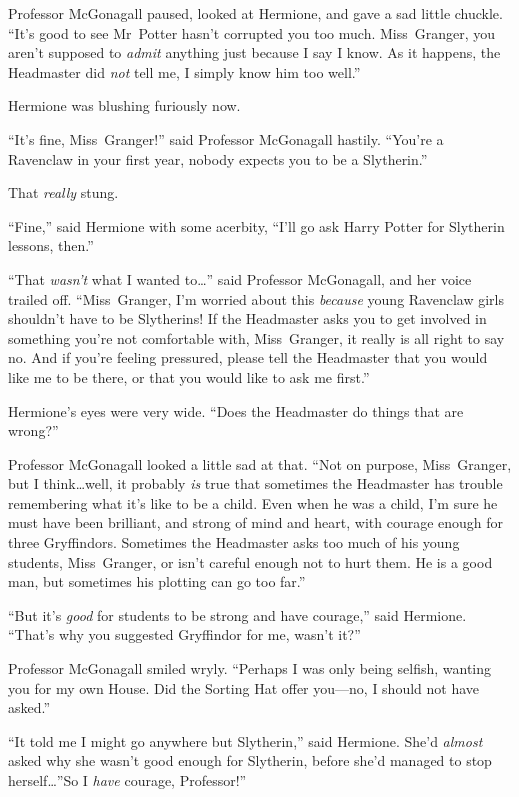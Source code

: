 Professor McGonagall paused, looked at Hermione, and gave a sad little chuckle. “It’s good to see Mr~Potter hasn’t corrupted you too much. Miss~Granger, you aren’t supposed to \emph{admit} anything just because I say I know. As it happens, the Headmaster did \emph{not} tell me, I simply know him too well.”

Hermione was blushing furiously now.

“It’s fine, Miss~Granger!” said Professor McGonagall hastily. “You’re a Ravenclaw in your first year, nobody expects you to be a Slytherin.”

That \emph{really} stung.

“Fine,” said Hermione with some acerbity, “I’ll go ask Harry Potter for Slytherin lessons, then.”

“That \emph{wasn’t} what I wanted to…” said Professor McGonagall, and her voice trailed off. “Miss~Granger, I’m worried about this \emph{because} young Ravenclaw girls shouldn’t have to be Slytherins! If the Headmaster asks you to get involved in something you’re not comfortable with, Miss~Granger, it really is all right to say no. And if you’re feeling pressured, please tell the Headmaster that you would like me to be there, or that you would like to ask me first.”

Hermione’s eyes were very wide. “Does the Headmaster do things that are wrong?”

Professor McGonagall looked a little sad at that. “Not on purpose, Miss~Granger, but I think…well, it probably \emph{is} true that sometimes the Headmaster has trouble remembering what it’s like to be a child. Even when he was a child, I’m sure he must have been brilliant, and strong of mind and heart, with courage enough for three Gryffindors. Sometimes the Headmaster asks too much of his young students, Miss~Granger, or isn’t careful enough not to hurt them. He is a good man, but sometimes his plotting can go too far.”

“But it’s \emph{good} for students to be strong and have courage,” said Hermione. “That’s why you suggested Gryffindor for me, wasn’t it?”

Professor McGonagall smiled wryly. “Perhaps I was only being selfish, wanting you for my own House. Did the Sorting Hat offer you—no, I should not have asked.”

“It told me I might go anywhere but Slytherin,” said Hermione. She’d \emph{almost} asked why she wasn’t good enough for Slytherin, before she’d managed to stop herself…”So I \emph{have} courage, Professor!”

